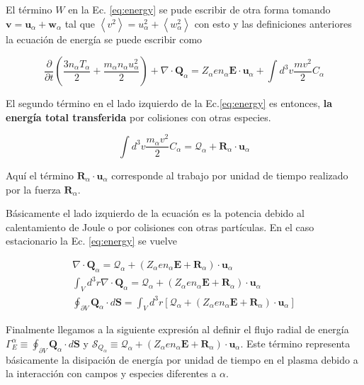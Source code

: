   El t\'ermino $W$ en la Ec. \eqref{eq:energy} se pude escribir de otra forma tomando $\textbf{v} = \textbf{u}_\alpha + \textbf{w}_\alpha$ tal que $\left<v^2\right> = u^2_\alpha + \left<w_\alpha^2\right>$ con esto y las definiciones anteriores la  ecuaci\'on de energ\'ia se puede escribir como \cite{helander2005} 

  \begin{equation}\label{eq:energy2}
    \frac{\partial}{\partial t}\left(\frac{3n_\alpha T_\alpha}{2} + \frac{m_\alpha n_\alpha u_\alpha^2}{2}\right) + \nabla\cdot\textbf{Q}_\alpha = Z_\alpha e n_\alpha \textbf{E}\cdot\textbf{u}_\alpha + \int d^3v\frac{mv^2}{2}C_\alpha
  \end{equation} 

  El segundo t\'ermino en el lado izquierdo de la Ec.\eqref{eq:energy} es entonces, \textbf{la energ\'ia total transferida} por colisiones con otras especies.

  \begin{equation}
     \int d^3v \frac{m_\alpha v^2}{2}C_\alpha = \mathcal{Q}_\alpha + \textbf{R}_\alpha\cdot\textbf{u}_\alpha
  \end{equation}

  Aqu\'i el t\'ermino $\textbf{R}_\alpha\cdot\textbf{u}_\alpha$ corresponde al trabajo por unidad de tiempo realizado por la fuerza $\textbf{R}_\alpha$.

  B\'asicamente el lado izquierdo de la ecuaci\'on es la potencia debido al calentamiento de Joule o por colisiones con otras part\'iculas. En el caso estacionario la Ec. \eqref{eq:energy} se vuelve

  \begin{eqnarray}
  \nabla\cdot\textbf{Q}_\alpha = \mathcal{Q}_\alpha + (Z_\alpha e n_\alpha\textbf{E} + \textbf{R}_\alpha)\cdot\textbf{u}_\alpha \nonumber\\
    \int_V d^3r \nabla\cdot\textbf{Q}_\alpha = \mathcal{Q}_\alpha + (Z_\alpha e n_\alpha\textbf{E} + \textbf{R}_\alpha)\cdot\textbf{u}_\alpha\nonumber\\
    \oint_{\partial V} \textbf{Q}_\alpha\cdot d\textbf{S} = \int_V d^3r\left[\mathcal{Q}_\alpha + (Z_\alpha e n_\alpha\textbf{E} + \textbf{R}_\alpha)\cdot\textbf{u}_\alpha\right] \nonumber
    \end{eqnarray}

    Finalmente llegamos a la siguiente expresi\'on al definir el flujo radial de energ\'ia $\Gamma_E^\alpha \equiv \oint_{\partial V} \textbf{Q}_\alpha\cdot d\textbf{S}$ y $\mathcal{S}_{Q_\alpha} \equiv \mathcal{Q}_{\alpha} + (Z_\alpha e n_\alpha\textbf{E} + \textbf{R}_\alpha)\cdot\textbf{u}_\alpha$. Este t\'ermino representa b\'asicamente la disipaci\'on de energ\'ia por unidad de tiempo en el plasma debido a la interacci\'on con campos y especies diferentes a $\alpha$.

